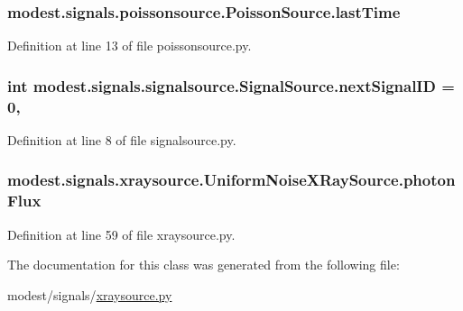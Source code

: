 \subsubsection[{\texorpdfstring{last\+Time}{lastTime}}]{\setlength{\rightskip}{0pt plus 5cm}modest.\+signals.\+poissonsource.\+Poisson\+Source.\+last\+Time\hspace{0.3cm}{\ttfamily [inherited]}}\hypertarget{classmodest_1_1signals_1_1poissonsource_1_1PoissonSource_a34395fc83bd8743a0a5ee69f9392a606}{}\label{classmodest_1_1signals_1_1poissonsource_1_1PoissonSource_a34395fc83bd8743a0a5ee69f9392a606}


Definition at line 13 of file poissonsource.\+py.

\subsubsection[{\texorpdfstring{next\+Signal\+ID}{nextSignalID}}]{\setlength{\rightskip}{0pt plus 5cm}int modest.\+signals.\+signalsource.\+Signal\+Source.\+next\+Signal\+ID = 0\hspace{0.3cm}{\ttfamily [static]}, {\ttfamily [inherited]}}\hypertarget{classmodest_1_1signals_1_1signalsource_1_1SignalSource_a453eafb550b551adbec0903deb63dfce}{}\label{classmodest_1_1signals_1_1signalsource_1_1SignalSource_a453eafb550b551adbec0903deb63dfce}


Definition at line 8 of file signalsource.\+py.

\subsubsection[{\texorpdfstring{photon\+Flux}{photonFlux}}]{\setlength{\rightskip}{0pt plus 5cm}modest.\+signals.\+xraysource.\+Uniform\+Noise\+X\+Ray\+Source.\+photon\+Flux}\hypertarget{classmodest_1_1signals_1_1xraysource_1_1UniformNoiseXRaySource_a9b8049972baf6e0640181b58850a3d20}{}\label{classmodest_1_1signals_1_1xraysource_1_1UniformNoiseXRaySource_a9b8049972baf6e0640181b58850a3d20}


Definition at line 59 of file xraysource.\+py.



The documentation for this class was generated from the following file\+:\begin{DoxyCompactItemize}
\item 
modest/signals/\hyperlink{xraysource_8py}{xraysource.\+py}\end{DoxyCompactItemize}
